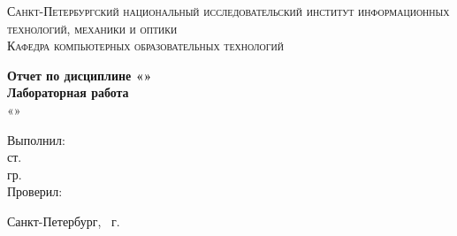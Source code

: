 \begin{titlepage}
    \begin{center}
        \textsc{Санкт-Петербургский национальный исследовательский институт информационных технологий, механики и оптики\\[5mm]
        Кафедра компьютерных образовательных технологий}

        \vfill

        \textbf{Отчет по дисциплине «\discipline»\\[3mm]
        Лабораторная работа \labNumber\\[3mm]
        }
        «\labName»\\[20mm]
    \end{center}

    \hfill
    \begin{minipage}{.5\textwidth}
        Выполнил:\\[2mm]
        ст. \student\\
        гр. \studentGroup\\[5mm]

        Проверил:\\[2mm]
        \tutor
    \end{minipage}%
    \vfill
    \begin{center}
        Санкт-Петербург, \theyear\ г.
    \end{center}
\end{titlepage}
